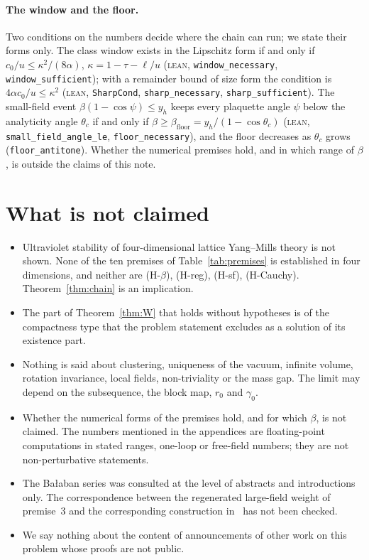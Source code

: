 \documentclass[11pt,a4paper]{article}
\theoremstyle{definition}
\theoremstyle{remark}
\newcommand{\tagL}{\textsc{lean}}
\newcommand{\lt}[1]{\texttt{#1}}
\begin{document}
\paragraph{The window and the floor.} Two conditions on the numbers decide where the chain can run; we state their forms only. The class window exists in the Lipschitz form if and only if $c_0/u\le\kappa^2/(8\alpha)$, $\kappa=1-\tau-\ell/u$ (\tagL, \lt{window\_\allowbreak{}necessary}, \lt{window\_\allowbreak{}sufficient}); with a remainder bound of size form the condition is $4\alpha c_0/u\le\kappa^2$ (\tagL, \lt{SharpCond}, \lt{sharp\_\allowbreak{}necessary}, \lt{sharp\_\allowbreak{}sufficient}). The small-field event $\beta(1-\cos\psi)\le y_h$ keeps every plaquette angle $\psi$ below the analyticity angle $\theta_c$ if and only if $\beta\ge\beta_{\mathrm{floor}}=y_h/(1-\cos\theta_c)$ (\tagL, \lt{small\_\allowbreak{}field\_\allowbreak{}angle\_\allowbreak{}le}, \lt{floor\_\allowbreak{}necessary}), and the floor decreases as $\theta_c$ grows (\lt{floor\_\allowbreak{}antitone}). Whether the numerical premises hold, and in which range of $\beta$, is outside the claims of this note.

\section{What is not claimed}\label{sec:notclaimed}
\begin{itemize}[leftmargin=2em]
\item Ultraviolet stability of four-dimensional lattice Yang--Mills theory is not shown. None of the ten premises of Table~\ref{tab:premises} is established in four dimensions, and neither are (H-$\beta$), (H-reg), (H-sf), (H-Cauchy). Theorem~\ref{thm:chain} is an implication.
\item The part of Theorem~\ref{thm:W} that holds without hypotheses is of the compactness type that the problem statement excludes as a solution of its existence part.
\item Nothing is said about clustering, uniqueness of the vacuum, infinite volume, rotation invariance, local fields, non-triviality or the mass gap. The limit may depend on the subsequence, the block map, $r_0$ and $\gamma_0$.
\item Whether the numerical forms of the premises hold, and for which $\beta$, is not claimed. The numbers mentioned in the appendices are floating-point computations in stated ranges, one-loop or free-field numbers; they are not non-perturbative statements.
\item The Bałaban series was consulted at the level of abstracts and introductions only. The correspondence between the regenerated large-field weight of premise~3 and the corresponding construction in~\cite{B122b} has not been checked.
\item We say nothing about the content of announcements of other work on this problem whose proofs are not public.
\end{itemize}
\end{document}
